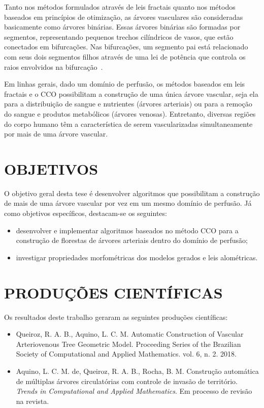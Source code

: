 Tanto nos métodos formulados através de leis fractais quanto nos métodos 
baseados em princípios de otimização, as árvores vasculares
são consideradas basicamente como árvores binárias. Essas árvores binárias
são formadas por segmentos, representando pequenos trechos cilíndricos
de vasos, que estão conectados em bifurcações. Nas bifurcações, um segmento
pai está relacionado com seus dois segmentos filhos através de uma lei 
de potência que controla os raios envolvidos na bifurcação~\cite{Sherman1981}.

Em linhas gerais, dado um domínio de perfusão, os métodos baseados em leis fractais 
e o CCO possibilitam a construção de
uma única árvore vascular, seja ela para a distribuição de sangue e nutrientes 
(árvores arteriais) ou para a remoção do sangue e produtos metabólicos (árvores venosas). 
Entretanto, diversas regiões do corpo humano têm a característica de serem vascularizadas 
simultaneamente por mais de uma árvore vascular.

\section{OBJETIVOS}

O objetivo geral desta tese é desenvolver algoritmos que possibilitam 
a construção de mais de uma árvore vascular por vez em um mesmo domínio de perfusão. 
Já como objetivos específicos, destacam-se os seguintes:
\begin{itemize}
  \item desenvolver e implementar algoritmos baseados no método CCO para a construção
  de florestas de árvores arteriais dentro do domínio de perfusão;
  \item investigar propriedades morfométricas dos modelos gerados e leis alométricas.
\end{itemize}

\section{PRODUÇÕES CIENTÍFICAS}

Os resultados deste trabalho geraram as seguintes produções científicas:

\begin{itemize}
 \item Queiroz, R. A. B., Aquino, L. C. M. Automatic Construction of Vascular Arteriovenous 
 Tree Geometric Model. Proceeding Series of the Brazilian Society of 
 Computational and Applied Mathematics. vol. 6, n. 2. 2018.
 \item Aquino, L. C. M. de, Queiroz, R. A. B., Rocha, B. M. Construção automática de múltiplas
 árvores circulatórias com controle de invasão de território. 
 \emph{Trends in Computational and Applied Mathematics}. Em processo de revisão na revista.
\end{itemize}

